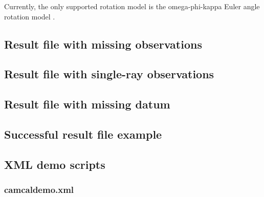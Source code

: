 \documentclass{article}
\begin{document}
Currently, the only supported rotation model is the omega-phi-kappa
Euler angle rotation model \citep[Ch.~2.1.2.3]{McGlone2004:Manual}.

\subsection{Result file with missing observations}
\label{sec:missingObsResultFile}

\scriptsize



\subsection{Result file with single-ray observations}
\label{sec:singleRayResultFile}

\scriptsize



\subsection{Result file with missing datum}
\label{sec:missingDatumResultFile}

\scriptsize



\subsection{Successful result file example}
\label{sec:resultFile}

\scriptsize


\newpage
\subsection{XML demo scripts}
\label{sec:XMLdemoScripts}

\subsubsection{camcaldemo.xml}
\end{document}
